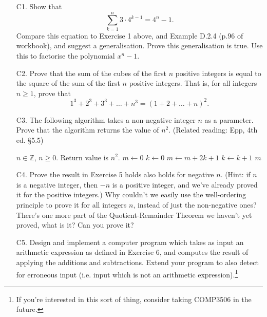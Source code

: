 \documentclass[a4paper,12pt]{article}
\begin{document}
\begin{enumerate}
\item[C1.] Show that
\[
    \sum_{k=1}^n 3 \cdot 4^{k-1} = 4^n - 1.
\]
Compare this equation to Exercise 1 above, and Example D.2.4 (p.96 of
workbook), and suggest a generalisation. Prove this generalisation is true.
Use this to factorise the polynomial $x^n - 1$.
\item[C2.] Prove that the sum of the cubes of the first $n$ positive integers is
equal to the square of the sum of the first $n$ positive integers. That is,
for all integers $n \geq 1$, prove that
\[ 1^3 + 2^3 + 3^3 + \dots + n^3 = (1 + 2 + \dots + n)^2. \]
\item[C3.]
The following algorithm takes a non-negative integer $n$ as a parameter. Prove
that the algorithm returns the value of $n^2$. (Related reading: Epp, 4th ed.
\S 5.5)
\begin{algorithmic}[1]
    \Require $n \in \mathbb{Z}$, $n \geq 0$.
    \Ensure Return value is $n^2$.
    \State $m \gets 0$
    \State $k \gets 0$
        \State $m \gets m + 2k + 1$
        \State $k \gets k + 1$
    \EndWhile
    \State \Return $m$
\EndFunction
\end{algorithmic}
\item[C4.]
Prove the result in Exercise 5 holds also holds for negative $n$.
(Hint: if $n$ is a negative integer, then $-n$ is a positive integer, and we've
already proved it for the positive integers.)
Why couldn't we easily use the well-ordering principle to prove it for all
integers $n$, instead of just the non-negative ones?
There's one more part of the Quotient-Remainder Theorem we haven't yet proved,
what is it? Can you prove it?
\item[C5.]
Design and implement a computer program which takes as input an arithmetic
expression as defined in Exercise 6, and computes the result of applying the
additions and subtractions. Extend your program to also detect for erroneous
input (i.e. input which is not an arithmetic expression).\footnote{If you're
interested in this sort of thing, consider taking COMP3506 in the future.}
\end{enumerate}
\end{document}
